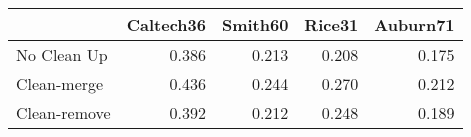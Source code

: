 \begin{tabular}{lrrrr}
\toprule
{} & Caltech36 & Smith60 & Rice31 & Auburn71 \\
\midrule
No Clean Up  &     0.386 &   0.213 &  0.208 &    0.175 \\
Clean-merge  &     0.436 &   0.244 &  0.270 &    0.212 \\
Clean-remove &     0.392 &   0.212 &  0.248 &    0.189 \\
\bottomrule
\end{tabular}
